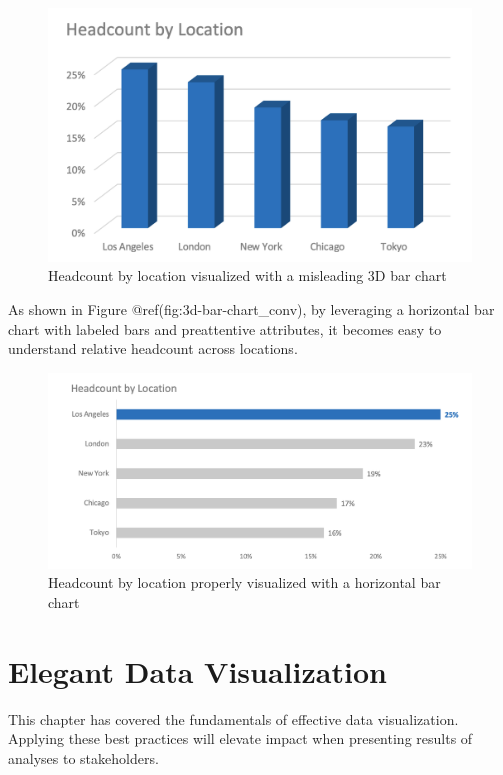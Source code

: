 \documentclass[
]{book}
\begin{document}
\begin{figure}

{\centering \includegraphics[width=0.75\linewidth]{graphics/3d_bar_chart} 

}

\caption{Headcount by location visualized with a misleading 3D bar chart}\label{fig:3d-bar-chart}
\end{figure}

As shown in Figure @ref(fig:3d-bar-chart\_conv), by leveraging a horizontal bar chart with labeled bars and preattentive attributes, it becomes easy to understand relative headcount across locations.

\begin{figure}

{\centering \includegraphics[width=0.75\linewidth]{graphics/horizontal_bar_chart_2} 

}

\caption{Headcount by location properly visualized with a horizontal bar chart}\label{fig:3d-bar-chart-conv}
\end{figure}

\hypertarget{elegant-data-visualization}{%
\section{Elegant Data Visualization}\label{elegant-data-visualization}}

This chapter has covered the fundamentals of effective data visualization. Applying these best practices will elevate impact when presenting results of analyses to stakeholders.
\end{document}

